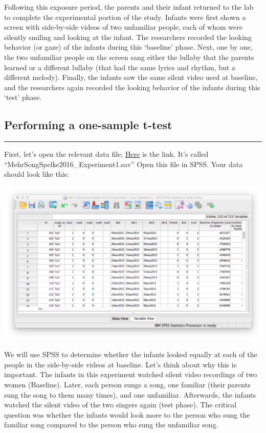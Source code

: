 \documentclass[
]{book}
\begin{document}
Following this exposure period, the parents and their infant returned to the lab to complete the experimental portion of the study. Infants were first shown a screen with side-by-side videos of two unfamiliar people, each of whom were silently smiling and looking at the infant. The researchers recorded the looking behavior (or gaze) of the infants during this `baseline' phase. Next, one by one, the two unfamiliar people on the screen sang either the lullaby that the parents learned or a different lullaby (that had the same lyrics and rhythm, but a different melody). Finally, the infants saw the same silent video used at baseline, and the researchers again recorded the looking behavior of the infants during this `test' phase.

\hypertarget{performing-a-one-sample-t-test}{%
\subsection{Performing a one-sample t-test}\label{performing-a-one-sample-t-test}}

\begin{center}\rule{0.5\linewidth}{0.5pt}\end{center}

First, let's open the relevant data file; \href{https://github.com/CrumpLab/statisticsLab/blob/master/data/spssdata/MehrSongSpelke2016_Experiment1.sav}{Here} is the link. It's called ``MehrSongSpelke2016\_Experiment1.sav'' Open this file in SPSS. Your data should look like this:

\includegraphics{img/6.4.11.png}

We will use SPSS to determine whether the infants looked equally at each of the people in the side-by-side videos at baseline. Let's think about why this is important. The infants in this experiment watched silent video recordings of two women (Baseline). Later, each person sungs a song, one familiar (their parents sung the song to them many times), and one unfamiliar. Afterwards, the infants watched the silent video of the two singers again (test phase). The critical question was whether the infants would look more to the person who sung the familiar song compared to the person who sung the unfamiliar song.
\end{document}
